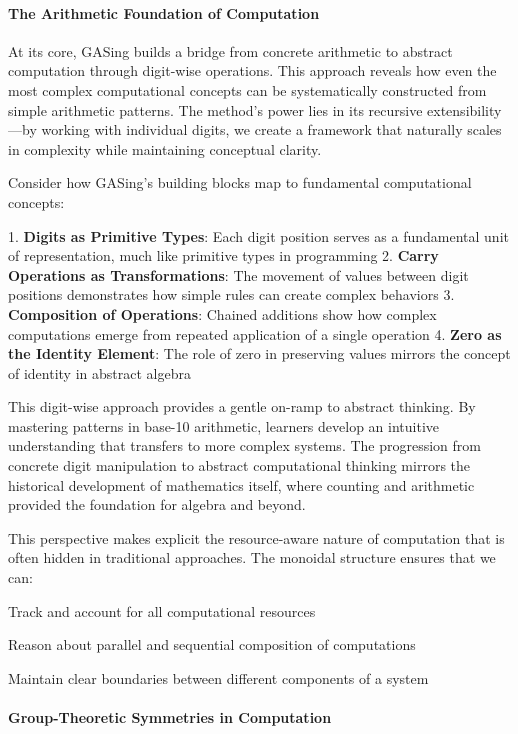 \paragraph{The Arithmetic Foundation of Computation}

At its core, GASing builds a bridge from concrete arithmetic to abstract computation through digit-wise operations. This approach reveals how even the most complex computational concepts can be systematically constructed from simple arithmetic patterns. The method's power lies in its recursive extensibility—by working with individual digits, we create a framework that naturally scales in complexity while maintaining conceptual clarity.

Consider how GASing's building blocks map to fundamental computational concepts:

1. \textbf{Digits as Primitive Types}: Each digit position serves as a fundamental unit of representation, much like primitive types in programming
2. \textbf{Carry Operations as Transformations}: The movement of values between digit positions demonstrates how simple rules can create complex behaviors
3. \textbf{Composition of Operations}: Chained additions show how complex computations emerge from repeated application of a single operation
4. \textbf{Zero as the Identity Element}: The role of zero in preserving values mirrors the concept of identity in abstract algebra

This digit-wise approach provides a gentle on-ramp to abstract thinking. By mastering patterns in base-10 arithmetic, learners develop an intuitive understanding that transfers to more complex systems. The progression from concrete digit manipulation to abstract computational thinking mirrors the historical development of mathematics itself, where counting and arithmetic provided the foundation for algebra and beyond.

This perspective makes explicit the resource-aware nature of computation that is often hidden in traditional approaches. The monoidal structure ensures that we can:

\noindent Track and account for all computational resources


\noindent Reason about parallel and sequential composition of computations


\noindent Maintain clear boundaries between different components of a system

\paragraph{Group-Theoretic Symmetries in Computation}

